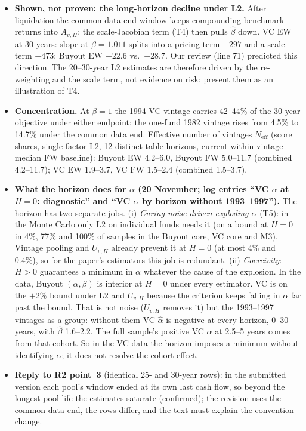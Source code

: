 \documentclass[11pt]{article}
\begin{document}
\begin{itemize}
\item \textbf{Shown, not proven: the long-horizon decline under L2.} After liquidation the common-data-end window keeps compounding benchmark returns into $A_{v,H}$; the scale-Jacobian term (T4) then pulls $\hat\beta$ down. VC EW at 30 years: slope at $\beta=1.011$ splits into a pricing term $-297$ and a scale term $+473$; Buyout EW $-22.6$ vs.\ $+28.7$. Our review (line 71) predicted this direction. The 20--30-year L2 estimates are therefore driven by the re-weighting and the scale term, not evidence on risk; present them as an illustration of T4.
\item \textbf{Concentration.} At $\beta=1$ the 1994 VC vintage carries 42--44\% of the 30-year objective under either endpoint; the one-fund 1982 vintage rises from 4.5\% to 14.7\% under the common data end. Effective number of vintages $N_{\mathrm{eff}}$ (score shares, single-factor L2, 12 distinct table horizons, current within-vintage-median FW baseline): Buyout EW 4.2--6.0, Buyout FW 5.0--11.7 (combined 4.2--11.7); VC EW 1.9--3.7, VC FW 1.5--2.4 (combined 1.5--3.7).
\item \textbf{What the horizon does for $\alpha$ (20 November; log entries ``VC $\alpha$ at $H=0$: diagnostic'' and ``VC $\alpha$ by horizon without 1993--1997'').} The horizon has two separate jobs. (i) \emph{Curing noise-driven exploding $\alpha$} (T5): in the Monte Carlo only L2 on individual funds needs it (on a bound at $H=0$ in 4\%, 77\% and 100\% of samples in the Buyout core, VC core and M3). Vintage pooling and $U_{v,H}$ already prevent it at $H=0$ (at most 4\% and 0.4\%), so for the paper's estimators this job is redundant. (ii) \emph{Coercivity}: $H>0$ guarantees a minimum in $\alpha$ whatever the cause of the explosion. In the data, Buyout $(\alpha,\beta)$ is interior at $H=0$ under every estimator. VC is on the $+2\%$ bound under L2 and $U_{v,H}$ because the criterion keeps falling in $\alpha$ far past the bound. That is not noise ($U_{v,H}$ removes it) but the 1993--1997 vintages as a group: without them VC $\hat\alpha$ is negative at every horizon, 0--30 years, with $\hat\beta$ 1.6--2.2. The full sample's positive VC $\hat\alpha$ at 2.5--5 years comes from that cohort. So in the VC data the horizon imposes a minimum without identifying $\alpha$; it does not resolve the cohort effect.
\item \textbf{Reply to R2 point~3} (identical 25- and 30-year rows): in the submitted version each pool's window ended at its own last cash flow, so beyond the longest pool life the estimates saturate (confirmed); the revision uses the common data end, the rows differ, and the text must explain the convention change.
\end{itemize}
\end{document}
